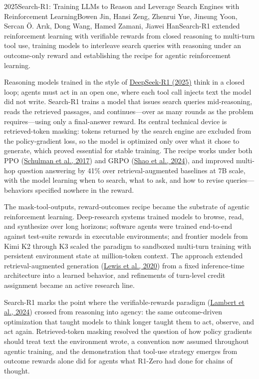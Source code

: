 
\begin{papersummary}{2025}{Search-R1: Training LLMs to Reason and Leverage Search Engines with Reinforcement Learning}{Bowen Jin, Hansi Zeng, Zhenrui Yue, Jinsung Yoon, Sercan \"O. Ar\i k, Dong Wang, Hamed Zamani, Jiawei Han}{Search-R1 extended reinforcement learning with verifiable rewards from closed reasoning to multi-turn tool use, training models to interleave search queries with reasoning under an outcome-only reward and establishing the recipe for agentic reinforcement learning.}

Reasoning models trained in the style of \hyperref[paper:deepseek-2025-r1]{DeepSeek-R1 (2025)} think in a closed loop; agents must act in an open one, where each tool call injects text the model did not write. Search-R1 trains a model that issues search queries mid-reasoning, reads the retrieved passages, and continues---over as many rounds as the problem requires---using only a final-answer reward. Its central technical device is retrieved-token masking: tokens returned by the search engine are excluded from the policy-gradient loss, so the model is optimized only over what it chose to generate, which proved essential for stable training. The recipe works under both PPO (\hyperref[paper:schulman-2017-ppo]{Schulman et al., 2017}) and GRPO (\hyperref[paper:shao-2024-grpo]{Shao et al., 2024}), and improved multi-hop question answering by 41\% over retrieval-augmented baselines at 7B scale, with the model learning when to search, what to ask, and how to revise queries---behaviors specified nowhere in the reward.

The mask-tool-outputs, reward-outcomes recipe became the substrate of agentic reinforcement learning. Deep-research systems trained models to browse, read, and synthesize over long horizons; software agents were trained end-to-end against test-suite rewards in executable environments; and frontier models from Kimi K2 through K3 scaled the paradigm to sandboxed multi-turn training with persistent environment state at million-token context. The approach extended retrieval-augmented generation (\hyperref[paper:lewis-2020]{Lewis et al., 2020}) from a fixed inference-time architecture into a learned behavior, and refinements of turn-level credit assignment became an active research line.

Search-R1 marks the point where the verifiable-rewards paradigm (\hyperref[paper:lambert-2024-tulu3]{Lambert et al., 2024}) crossed from reasoning into agency: the same outcome-driven optimization that taught models to think longer taught them to act, observe, and act again. Retrieved-token masking resolved the question of how policy gradients should treat text the environment wrote, a convention now assumed throughout agentic training, and the demonstration that tool-use strategy emerges from outcome rewards alone did for agents what R1-Zero had done for chains of thought.

\end{papersummary}
